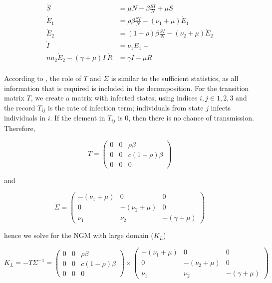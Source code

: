 \documentclass[12pt]{article}
\begin{document}
\begin{align*}
\dot{S} & =  \mu N - \beta\frac{SI}{N} + \mu S \\
\dot{E}_{1}  & =  \rho \beta \frac{SI}{N} - (\nu_{1} + \mu)\dot{E}_{1} \\
\dot{E}_{2}  & =  (1 - \rho) \beta \frac{SI}{N} - (\nu_{2} + \mu)\dot{E}_{2}\\
\dot{I}  & =  \nu_{1} \dot{E}_{1}  + \\nu_{2} \dot{E}_{2}  - (\gamma + \mu) I\
\dot{R}  & =  \gamma I - \mu R\\
\end{align*}

According to \cite{Diekmann:2010}, the role of $T$ and $\Sigma$ is similar to the sufficient statistics, as all information that is required is included in the decomposition. For the transition matrix $T$, we create a matrix with infected states, using indices $i, j\in {1, 2, 3}$ and the record $T_{ij}$ is the rate of infection term; individuals from state $j$ infects individuals in $i$. If the element in $T_{ij}$ is 0, then there is no chance of transmission.  Therefore, 



\begin{equation*}
T=
\begin{pmatrix}
0 & 0 & \rho \beta\\
0 & 0 & c (1-\rho)\beta\\
0 & 0 & 0
\end{pmatrix}
\end{equation*}

and 

\begin{equation*}
\Sigma=
\begin{pmatrix}
-(\nu_{1}+\mu) & 0 & 0\\
0 & -(\nu_{2}+\mu) & 0\\
\nu_{1} &  \nu_{2}& -(\gamma + \mu)
\end{pmatrix}
\end{equation*}

hence we solve for the NGM with large domain ($K_{L}$)

\begin{equation*}
K_{L} = -T\Sigma^{-1} = 
\begin{pmatrix}
0 & 0 & \rho \beta\\
0 & 0 & c (1-\rho)\beta\\
0 & 0 & 0
\end{pmatrix}
\times
\begin{pmatrix}
-(\nu_{1}+\mu) & 0 & 0\\
0 & -(\nu_{2}+\mu) & 0\\
\nu_{1} &  \nu_{2}& -(\gamma + \mu)
\end{pmatrix}
\end{equation*}
\end{document}
